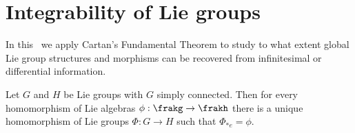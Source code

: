 \section{Integrability of Lie groups}\label{sec: existence of homs}


In this \sect\ we apply Cartan's Fundamental Theorem to study to what extent global Lie group structures and morphisms can be recovered from infinitesimal or differential information.


\begin{thm}\label{thm second principle}
    Let $G$ and $H$ be Lie groups with $G$ simply connected. Then for every homomorphism of Lie algebras $\phi:\frakg\to\frakh$ there is a unique homomorphism of Lie groups $\Phi:G\to H$ such that $\Phi_{\ast e}=\phi$.
\end{thm}
